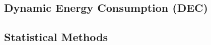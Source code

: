 \subsection{Dynamic Energy Consumption (DEC)}



\subsection{Statistical Methods}\label{subsec:Statistics}



%


